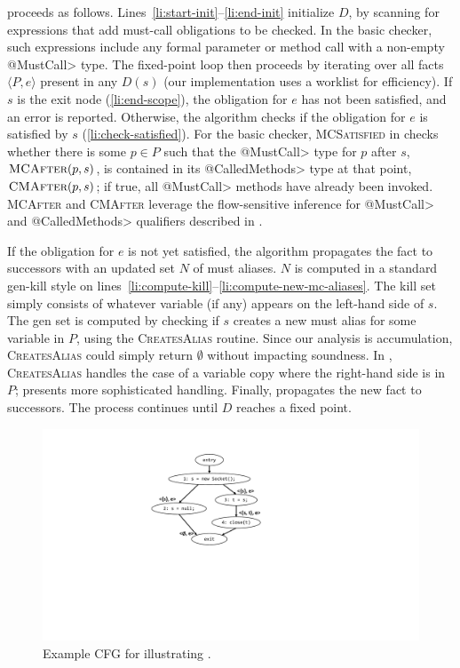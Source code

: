  proceeds as follows.
Lines~\ref{li:start-init}--\ref{li:end-init} initialize $D$, by scanning for
expressions that add must-call obligations to be checked.  
In the basic checker, such expressions include any formal parameter or method
call with a non-empty \<@MustCall> type.  The fixed-point loop then proceeds by
iterating over all facts $\langle P, e \rangle$ present in any $D(s)$ (our
implementation uses a worklist for efficiency).  If $s$ is the exit node
(\cref{li:end-scope}), the obligation for $e$ has not been satisfied, and an
error is reported.  Otherwise, the algorithm checks if the obligation for $e$ is
satisfied by $s$ (\cref{li:check-satisfied}).  For the basic checker, \textsc{MCSatisfied} in
 checks whether there is some $p \in P$ such that
the \<@MustCall> type for $p$ after $s$, $\textsc{MCAfter}(p,s)$, is
contained in its \<@CalledMethods> type at that point, $\textsc{CMAfter}(p,s)$;
if true, all \<@MustCall> methods have already been invoked.  \textsc{MCAfter}
and \textsc{CMAfter} leverage the flow-sensitive inference for \<@MustCall> and
\<@CalledMethods> qualifiers described in .
 

If the obligation for $e$ is not yet satisfied, the algorithm propagates the
fact to successors with an updated set $N$ of must aliases.  $N$ is computed in
a standard gen-kill style on
lines~\ref{li:compute-kill}--\ref{li:compute-new-mc-aliases}.  The kill set
simply consists of whatever variable (if any) appears on the left-hand side of
$s$.  The gen set is computed by checking if $s$ creates a new must alias for
some variable in $P$, using the \textsc{CreatesAlias} routine.  Since our
analysis is accumulation, \textsc{CreatesAlias} could simply return
$\emptyset$
without impacting soundness.  In , \textsc{CreatesAlias}
handles the case of a variable copy where the right-hand side is in $P$;
 presents more sophisticated handling. Finally,
 propagates the new fact to successors.  The process
continues until $D$ reaches a fixed point.

\begin{figure}
  \includegraphics[width=0.65\columnwidth,keepaspectratio]{cfg-example.pdf}
  \caption{Example CFG for illustrating .}
  \label{fig:cfg-example}
\end{figure}


